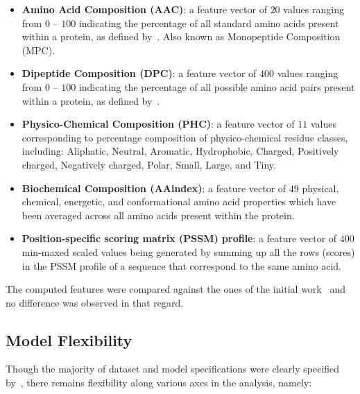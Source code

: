 \begin{itemize}
\item \textbf{Amino Acid Composition (AAC)}: a feature vector of $20$ values ranging from $0$ -- $100$ indicating the
percentage of all standard amino acids present within a protein, as defined by~\cite{gromiha2010protein}. Also known
as Monopeptide Composition (MPC).
\item \textbf{Dipeptide Composition (DPC)}: a feature vector of $400$ values ranging from $0$ -- $100$ indicating the
percentage of all possible amino acid pairs present within a protein, as defined by~\cite{gromiha2010protein}.
\item \textbf{Physico-Chemical Composition (PHC)}: a feature vector of $11$ values corresponding
to percentage composition of physico-chemical residue classes, including: Aliphatic, Neutral, Aromatic, Hydrophobic, Charged, Positively charged,
Negatively charged, Polar, Small, Large, and Tiny. 
\item \textbf{Biochemical Composition (AAindex)}: a feature vector of $49$ physical, chemical, energetic, and
conformational amino acid properties which have been averaged across all amino acids present within the protein.
\item \textbf{Position-specific scoring matrix (PSSM) profile}: a feature vector of $400$ min-maxed scaled values 
being generated by summing up all the rows (scores) in the PSSM profile of a sequence that correspond to the same amino acid.
\end{itemize}

{The computed features were compared against the ones of the initial work~\cite{mishra2014prediction} and no difference was 
observed in that regard.}
\subsection{Model Flexibility}
\label{sec:modelflex}
Though the majority of dataset and model specifications were clearly specified by~\cite{mishra2014prediction}, there
remains flexibility along various axes in the analysis, namely:

